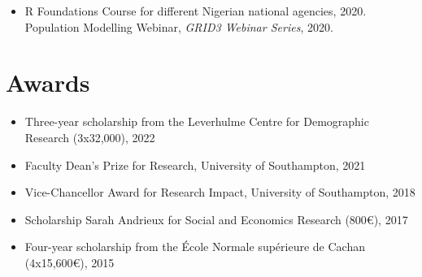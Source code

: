 \documentclass[
]{friggeri-cv}
\begin{document}
\begin{noside}
\begin{itemize}
\item R Foundations Course for different Nigerian national agencies, 2020. Population Modelling Webinar, \textit{GRID3 Webinar Series}, 2020. \href{https://www.youtube.com/watch?v=HMFM8HzLfH8}{\scriptsize{}}

\end{itemize}


\section{Awards}
\begin{itemize}
\item Three-year scholarship from the Leverhulme Centre for Demographic Research (3x32,000), 2022
\item Faculty Dean's Prize for Research, University of Southampton, 2021
\item Vice-Chancellor Award for Research Impact, University of Southampton, 2018
\item Scholarship Sarah Andrieux for Social and Economics Research (800€), 2017
\item Four-year scholarship from the École Normale supérieure de Cachan (4x15,600€), 2015
\end{itemize}
\end{noside}
\end{document}
